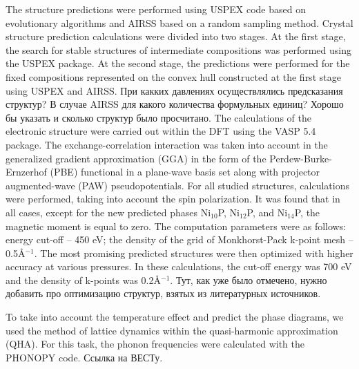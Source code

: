 \documentclass[twoside,twocolumn,9pt]{article}
\begin{document}
The structure predictions were performed using USPEX code based on evolutionary algorithms \cite{USPEX-GLASS2006713, USPEX-OGANOV-2006, USPEX-LYAKHOV-2010-1623} and AIRSS based on
a random sampling method.\cite{AIRSS-PhysRevLett.97.045504, AIRSS-Pickard_2011} 
Crystal structure prediction calculations were divided into two stages. At the first stage, the search for stable structures of intermediate compositions was performed using the USPEX package. 
At the second stage, the predictions were performed for the fixed compositions represented on the convex hull constructed at the first stage using USPEX and AIRSS.
При какких давлениях осуществлялись предсказания структур? В случае AIRSS для какого количества формульных единиц? Хорошо бы указать и сколько структур было просчитано.
The calculations of the electronic structure were carried out within the DFT using the VASP 5.4 package.\cite{VASP-1-PhysRevB.59.1758, VASP-2-PhysRevB.54.11169}
The exchange-correlation interaction was taken into account in the generalized  gradient approximation (GGA) in the form of the Perdew-Burke-Ernzerhof (PBE) functional \cite{PBE-PhysRevLett.78.1396} in a plane-wave basis set along with projector augmented-wave (PAW) pseudopotentials.\cite{PAW-PhysRevB.50.17953} 
For all studied structures, calculations were performed, taking into account the spin polarization. It was found that in all cases, except for the new predicted phases Ni$_{10}$P, Ni$_{12}$P, and Ni$_{14}$P, the magnetic moment is equal to zero. 
The computation parameters were as follows: energy cut-off -- 450 eV; the density of the grid of Monkhorst-Pack k-point mesh -- 0.5\AA$^{-1}$. 
The most promising predicted structures were then optimized with higher accuracy at various pressures. 
In these calculations, the cut-off energy was 700 eV and the density of k-points was 0.2\AA$^{-1}$. 
Тут, как уже было отмечено, нужно добавить про оптимизацию структур, взятых из литературных источников.

To take into account the temperature effect and predict the phase diagrams, we used the method of lattice dynamics within the quasi-harmonic approximation (QHA). 
For this task, the phonon frequencies were calculated with the PHONOPY code.\cite{phonopy}
Ссылка на ВЕСТу.

\end{document}
